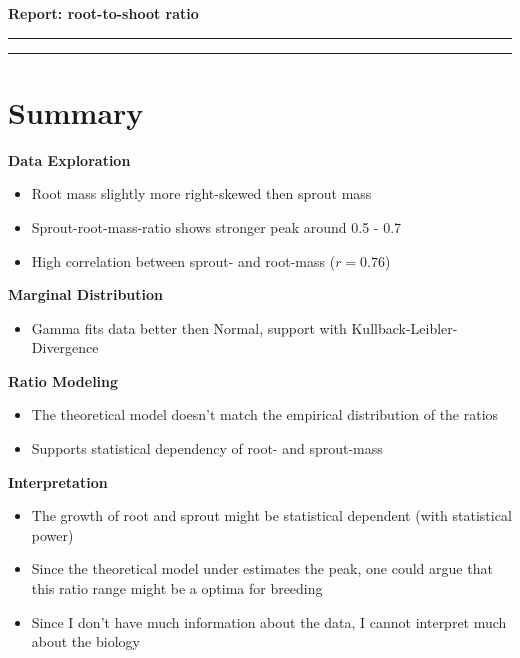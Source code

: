 \documentclass{article}
\def\reduceVerticalSpace{\vspace{-0.1cm}}
\def\reduceItemSpace{\itemsep0em }
\begin{document}
	\thispagestyle{empty}

	\begin{center}
		\LARGE
		\textbf{Report: root-to-shoot ratio} \vspace{0.5cm}
		\hrule
	\end{center}
	\tableofcontents
	\bigskip  
	\bigskip  
	\hrule
	
	\section{Summary}
		
		\textbf{Data Exploration}
		\begin{itemize}
			\reduceVerticalSpace
			\reduceItemSpace
			\item Root mass slightly more right-skewed then sprout mass
			\item Sprout-root-mass-ratio shows stronger peak around 0.5 - 0.7
			\item High correlation between sprout- and root-mass  ($r = 0.76$)
		\end{itemize}
		
		\textbf{Marginal Distribution}
		\begin{itemize}
			\reduceVerticalSpace
			\reduceItemSpace
			\item Gamma fits data better then Normal, support with Kullback-Leibler-Divergence
		\end{itemize}
		
		\textbf{Ratio Modeling}
		\begin{itemize}
			\reduceVerticalSpace
			\reduceItemSpace
			\item The theoretical model doesn't match the empirical distribution of the ratios
			\item Supports statistical dependency of root- and sprout-mass
		\end{itemize}
		
		\textbf{Interpretation}
		\begin{itemize}
			\reduceVerticalSpace
			\reduceItemSpace
			\item The growth of root and sprout might be statistical dependent (with statistical power)
			\item Since the theoretical model under estimates the peak, one could argue that this ratio range might be a optima for breeding
			\item Since I don't have much information about the data, I cannot interpret much about the biology
		\end{itemize}
		\newpage
\end{document}
